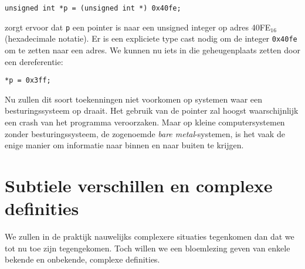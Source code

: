 \hspace*{1em}\texttt{unsigned int *p = (unsigned int *) 0x40fe;}

zorgt ervoor dat \texttt{p} een pointer is naar een unsigned integer op adres 40FE$_{16}$ (hexadecimale notatie). Er is een expliciete type cast nodig om de integer \texttt{0x40fe} om te zetten naar een adres. We kunnen nu iets in die geheugenplaats zetten door een dereferentie:

\hspace*{1em}\texttt{*p = 0x3ff;}

Nu zullen dit soort toekenningen niet voorkomen op systemen waar een besturingssysteem op draait. Het gebruik van de pointer zal hoogst waarschijnlijk een crash van het programma veroorzaken. Maar op kleine computersystemen zonder besturingssysteem, de zogenoemde \textsl{bare metal}-systemen, is het vaak de enige manier om informatie naar binnen en naar buiten te krijgen.



\section{Subtiele verschillen en complexe definities}
We zullen in de praktijk nauwelijks complexere situaties tegenkomen dan dat we tot nu toe zijn tegengekomen. Toch willen we een bloemlezing geven van enkele bekende en onbekende, complexe definities.

